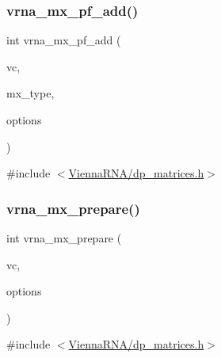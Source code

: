 \subsubsection{\texorpdfstring{vrna\+\_\+mx\+\_\+pf\+\_\+add()}{vrna\_mx\_pf\_add()}}
{\footnotesize\ttfamily int vrna\+\_\+mx\+\_\+pf\+\_\+add (\begin{DoxyParamCaption}\item[{\mbox{\hyperlink{group__fold__compound_ga1b0cef17fd40466cef5968eaeeff6166}{vrna\+\_\+fold\+\_\+compound\+\_\+t}} $\ast$}]{vc,  }\item[{\mbox{\hyperlink{group__dp__matrices_ga6042ea1d58d01931e959791be6d89343}{vrna\+\_\+mx\+\_\+type\+\_\+e}}}]{mx\+\_\+type,  }\item[{unsigned int}]{options }\end{DoxyParamCaption})}



{\ttfamily \#include $<$\mbox{\hyperlink{dp__matrices_8h}{Vienna\+R\+N\+A/dp\+\_\+matrices.\+h}}$>$}

\mbox{\label{group__dp__matrices_ga35e1fa4fdab869abb14f06ba5a3ba5b4}} 
\subsubsection{\texorpdfstring{vrna\+\_\+mx\+\_\+prepare()}{vrna\_mx\_prepare()}}
{\footnotesize\ttfamily int vrna\+\_\+mx\+\_\+prepare (\begin{DoxyParamCaption}\item[{\mbox{\hyperlink{group__fold__compound_ga1b0cef17fd40466cef5968eaeeff6166}{vrna\+\_\+fold\+\_\+compound\+\_\+t}} $\ast$}]{vc,  }\item[{unsigned int}]{options }\end{DoxyParamCaption})}



{\ttfamily \#include $<$\mbox{\hyperlink{dp__matrices_8h}{Vienna\+R\+N\+A/dp\+\_\+matrices.\+h}}$>$}

\mbox{\label{group__dp__matrices_ga6a9422feb5dfe5c64050cebf447672d0}} 
